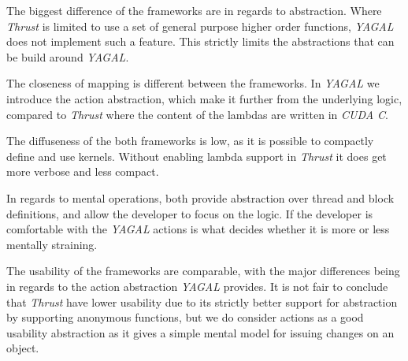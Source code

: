The biggest difference of the frameworks are in regards to abstraction. Where \textit{Thrust} is limited to use a set of general purpose higher order functions, \textit{YAGAL} does not implement such a feature. This strictly limits the abstractions that can be build around \textit{YAGAL}.

The closeness of mapping is different between the frameworks. In \textit{YAGAL} we introduce the action abstraction, which make it further from the underlying logic, compared to \textit{Thrust} where the content of the lambdas are written in \textit{CUDA C}.

The diffuseness of the both frameworks is low, as it is possible to compactly define and use kernels. Without enabling lambda support in \textit{Thrust} it does get more verbose and less compact.

In regards to mental operations, both provide abstraction over thread and block definitions, and allow the developer to focus on the logic. If the developer is comfortable with the \textit{YAGAL} actions is what decides whether it is more or less mentally straining.

The usability of the frameworks are comparable, with the major differences being in regards to the action abstraction \textit{YAGAL} provides. It is not fair to conclude that \textit{Thrust} have lower usability due to its strictly better support for abstraction by supporting anonymous functions, but we do consider actions as a good usability abstraction as it gives a simple mental model for issuing changes on an object.
